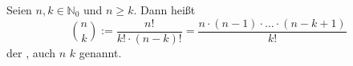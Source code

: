 Seien $n, k \in \mathbb{N}_0$ und $n \geq k$. Dann heißt
$$
\binom{n}{k} := \frac{n!}{k! \cdot (n-k)!} 
= \frac{n \cdot (n-1) \cdot \ldots \cdot (n-k+1)}{k!}
$$
der , auch $n$  $k$ genannt.